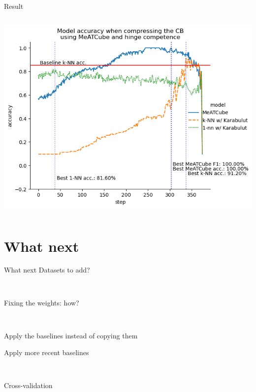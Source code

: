 \documentclass[]{beamer}
\begin{document}
\begin{frame}{Result}
\begin{columns}
\begin{column}{.65\textwidth}
            \includegraphics[width=.8\textwidth]{../results-weight-estim+/figs/balance+scale}
        \end{column}
    \end{columns}
\end{frame}


\section{What next}
\begin{frame}{What next}
    Datasets to add?

    ~

    Fixing the weights: how?

    ~

    Apply the baselines instead of copying them

    Apply more recent baselines

    ~

    Cross-validation
\end{frame}
\end{document}
